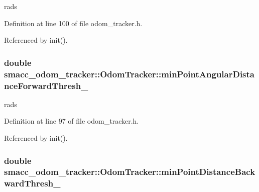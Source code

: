 rads 



Definition at line 100 of file odom\+\_\+tracker.\+h.



Referenced by init().

\subsubsection[{\texorpdfstring{min\+Point\+Angular\+Distance\+Forward\+Thresh\+\_\+}{minPointAngularDistanceForwardThresh_}}]{\setlength{\rightskip}{0pt plus 5cm}double smacc\+\_\+odom\+\_\+tracker\+::\+Odom\+Tracker\+::min\+Point\+Angular\+Distance\+Forward\+Thresh\+\_\+\hspace{0.3cm}{\ttfamily [protected]}}\hypertarget{classsmacc__odom__tracker_1_1OdomTracker_a1611f6e11f48e8c2bdf6d16adf35fa2a}{}\label{classsmacc__odom__tracker_1_1OdomTracker_a1611f6e11f48e8c2bdf6d16adf35fa2a}


rads 



Definition at line 97 of file odom\+\_\+tracker.\+h.



Referenced by init().

\subsubsection[{\texorpdfstring{min\+Point\+Distance\+Backward\+Thresh\+\_\+}{minPointDistanceBackwardThresh_}}]{\setlength{\rightskip}{0pt plus 5cm}double smacc\+\_\+odom\+\_\+tracker\+::\+Odom\+Tracker\+::min\+Point\+Distance\+Backward\+Thresh\+\_\+\hspace{0.3cm}{\ttfamily [protected]}}\hypertarget{classsmacc__odom__tracker_1_1OdomTracker_a79d94520c5da1852602aaf264377a82f}{}\label{classsmacc__odom__tracker_1_1OdomTracker_a79d94520c5da1852602aaf264377a82f}


